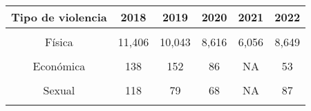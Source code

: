 \begin{tabular}[t]{cccccc}
\toprule
\textbf{Tipo de violencia} & \textbf{2018} & \textbf{2019} & \textbf{2020} & \textbf{2021} & \textbf{2022}\\
\midrule
\cellcolor[HTML]{B6B3FF}{Psicológica} & \cellcolor[HTML]{B6B3FF}{19,014} & \cellcolor[HTML]{B6B3FF}{19,357} & \cellcolor[HTML]{B6B3FF}{18,416} & \cellcolor[HTML]{B6B3FF}{15,827} & \cellcolor[HTML]{B6B3FF}{15,297}\\
Física & 11,406 & 10,043 & 8,616 & 6,056 & 8,649\\
\cellcolor[HTML]{B6B3FF}{VCM} & \cellcolor[HTML]{B6B3FF}{4,963} & \cellcolor[HTML]{B6B3FF}{9,556} & \cellcolor[HTML]{B6B3FF}{13,362} & \cellcolor[HTML]{B6B3FF}{21,788} & \cellcolor[HTML]{B6B3FF}{5,537}\\
Económica & 138 & 152 & 86 & NA & 53\\
\cellcolor[HTML]{B6B3FF}{Femicidio} & \cellcolor[HTML]{B6B3FF}{127} & \cellcolor[HTML]{B6B3FF}{121} & \cellcolor[HTML]{B6B3FF}{108} & \cellcolor[HTML]{B6B3FF}{123} & \cellcolor[HTML]{B6B3FF}{93}\\
Sexual & 118 & 79 & 68 & NA & 87\\
\cellcolor[HTML]{B6B3FF}{Otros tipos y  convinaciones} & \cellcolor[HTML]{B6B3FF}{11,704} & \cellcolor[HTML]{B6B3FF}{12,896} & \cellcolor[HTML]{B6B3FF}{11,647} & \cellcolor[HTML]{B6B3FF}{10,823} & \cellcolor[HTML]{B6B3FF}{10,471}\\
\bottomrule
\end{tabular}
